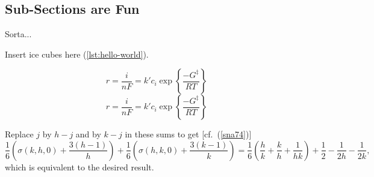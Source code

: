 \documentclass[letterpaper,12pt]{article}
\begin{document}
\subsection{Sub-Sections are Fun}
Sorta...


Insert ice cubes here (\ref{lst:hello-world}).



\ifbreqn

	\begin{equation*}
	r = \frac{i}{n F} = k' c_i \exp\left\{ \frac{-G^{\ddagger}}{R T} \right\}
	\end{equation*}
	\begin{equation*}
	r = \frac{i}{n F} = k' c_i \exp\left\{ \frac{-G^{\ddagger}}{R T} \right\}
	\end{equation*}

	Replace $j$ by $h-j$ and by $k-j$ in these sums to get [cf.~(\ref{sna74})]
	\begin{equation*}
	\label{sna74}
	\frac{1}{6} \left(\sigma(k,h,0) +\frac{3(h-1)}{h}\right)
	+\frac{1}{6} \left(\sigma(h,k,0) +\frac{3(k-1)}{k}\right)
	=\frac{1}{6} \left(\frac{h}{k} +\frac{k}{h} +\frac{1}{hk}\right)
	+\frac{1}{2} -\frac{1}{2h} -\frac{1}{2k},
	\end{equation*}
	which is equivalent to the desired result.
\fi


\end{document}
